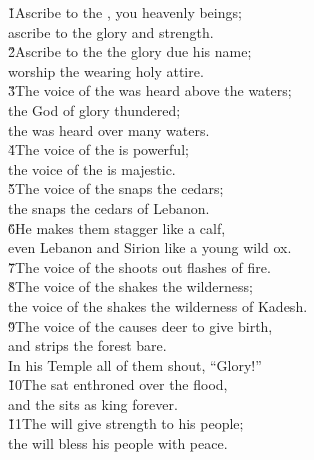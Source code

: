 \begin{poetry}
\poeml \v{1}Ascribe to the , you heavenly beings; \\
\poemll    ascribe to the  glory and strength. \\
\poeml \v{2}Ascribe to the  the glory due his name; \\
\poemll    worship the  wearing holy attire. \\
\poeml \v{3}The voice of the  was heard above the waters; \\
\poemll    the God of glory thundered; \\
\poemlll       the  was heard over many waters. \\
\poeml \v{4}The voice of the  is powerful; \\
\poemll    the voice of the  is majestic. \\
\poeml \v{5}The voice of the  snaps the cedars; \\
\poemll    the  snaps the cedars of Lebanon. \\
\poeml \v{6}He makes them stagger like a calf, \\
\poemll    even Lebanon and Sirion like a young wild ox. \\
\poeml \v{7}The voice of the  shoots out flashes of fire. \\
\poeml \v{8}The voice of the  shakes the wilderness; \\
\poemlll       the voice of the  shakes the wilderness of Kadesh. \\
\poeml \v{9}The voice of the  causes deer to give birth, \\
\poemll    and strips the forest bare. \\
\poemlll       In his Temple all of them shout, ``Glory!'' \\
\poeml \v{10}The  sat enthroned over the flood, \\
\poemll    and the  sits as king forever. \\
\poeml \v{11}The  will give strength to his people; \\
\poemll    the  will bless his people with peace.
\end{poetry}

